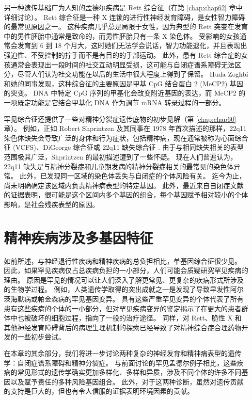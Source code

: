 另一种遗传基础广为人知的孟德尔疾病是 Rett 综合征（在第 \ref{chap:chap62} 章中详细讨论）。 
Rett 综合征是一种 X 连锁的进行性神经发育障碍，是女性智力障碍的最常见原因之一。 
这种疾病几乎总是局限于女性，因为典型的 Rett 突变在发育中的男性胚胎中通常是致命的，而男性胚胎只有一条 X 染色体。 
受影响的女孩通常会发育到 6 到 18 个月大，这时她们无法学会说话，智力功能退化，并且表现出强迫性、不受控制的拧手而不是有目的的手部运动。 
此外，患有 Rett 综合症的女孩通常会表现出一段时间的社交互动明显受损，这可能与自闭症谱系障碍无法区分，尽管人们认为社交功能在以后的生活中很大程度上得到了保留。 
Huda Zoghbi 和她的同事发现，这种综合征的主要原因是甲基 CpG 结合蛋白 2 (MeCP2) 基因的突变。 
DNA 中特定 CpG 序列的甲基化会改变附近基因的表达，而 MeCP2 的一项既定功能是它结合甲基化 DNA 作为调节 mRNA 转录过程的一部分。


罕见综合征还提供了一些对精神分裂症遗传底物的初步见解（第 \ref{chap:chap60} 章）。 
例如，正如 Robert Shprintzen 及其同事在 1978 年首次描述的那样，22q11 染色体缺失会导致广泛的身体和行为症状，包括精神病，现在通常被称为心面综合征 (VCFS)、DiGeorge 综合征或 22q11 缺失综合征 . 由于与相同缺失相关的表型范围极其广泛，Shprintzen 的最初描述遭到了一些怀疑。 
现在人们普遍认为，22q11 缺失是与精神分裂症和儿童期发病的精神分裂症相关的最常见的染色体异常。 
此外，已发现同一区域的染色体丢失与自闭症的个体风险有关。 
迄今为止，尚未明确确定该区域内负责精神病表型的特定基因。 
此外，最近来自自闭症文献的证据表明，很可能是这个区间内多个基因的组合，每个基因赋予相对较小的个体影响，是社会残疾表型的原因。


\section{精神疾病涉及多基因特征}
如前所述，与神经退行性疾病和精神疾病的总负担相比，单基因综合征很少见。 
因此，如果罕见疾病仅占总疾病负担的一小部分，人们可能会质疑研究罕见疾病的理由。 
原因是罕见的情况可以让人们深入了解更常见、更复杂的疾病形式所涉及的生物学过程。 
例如，人类遗传学取得的突出成就之一是发现了导致早发性阿尔茨海默病或帕金森病的罕见基因变异。 
具有这些严重罕见变异的个体代表了所有患有这些疾病的个体的一小部分，但对罕见疾病变异的鉴定揭示了在更大的患者群体中也被破坏的细胞过程，指向了一般的治疗途径。 
同样，对 Rett、脆性 X 和其他神经发育障碍背后的病理生理机制的探索已经导致了对精神综合症合理药物开发的一些初步尝试。


在本章的其余部分，我们将进一步讨论两种复杂的神经发育和精神病表型的遗传学：自闭症谱系障碍和精神分裂症。 
与前面讨论的罕见孟德尔例子相比，这些疾病的常见形式的遗传学确实更加多样化、多样和异质，涉及不同个体的许多不同基因以及赋予责任的多种风险基因组合。 
此外，对于这两种诊断，虽然对遗传贡献的支持是巨大的，但也有令人信服的证据表明环境因素的贡献。



